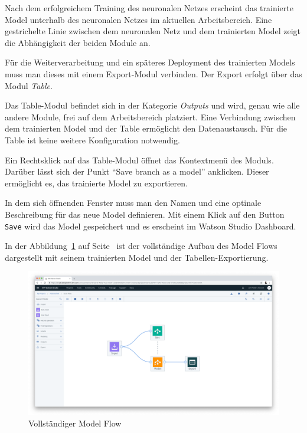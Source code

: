 Nach dem erfolgreichem Training des neuronalen Netzes erscheint das trainierte Model unterhalb des neuronalen Netzes im
aktuellen Arbeitsbereich. Eine gestrichelte Linie zwischen dem neuronalen Netz und dem trainierten Model zeigt die
Abhängigkeit der beiden Module an.

Für die Weiterverarbeitung und ein späteres Deployment des trainierten Models muss man dieses mit einem Export-Modul
verbinden. Der Export erfolgt über das Modul \textit{Table}.

Das Table-Modul befindet sich in der Kategorie \textit{Outputs} und wird, genau wie alle andere Module, frei auf dem
Arbeitsbereich platziert. Eine Verbindung zwischen dem trainierten Model und der Table ermöglicht den Datenaustausch.
Für die Table ist keine weitere Konfiguration notwendig.

Ein Rechtsklick auf das Table-Modul öffnet das Kontextmenü des Moduls. Darüber lässt sich der Punkt
\enquote{Save branch as a model} anklicken. Dieser ermöglicht es, das trainierte Model zu exportieren.

In dem sich öffnenden Fenster muss man den Namen und eine optinale Beschreibung für das neue Model definieren. Mit einem
Klick auf den Button \texttt{Save} wird das Model gespeichert und es erscheint im Watson Studio Dashboard.

In der Abbildung~\ref{fig:umsetzung_model_flow} auf Seite~\pageref{fig:umsetzung_model_flow} ist der vollständige Aufbau
des Model Flows dargestellt mit seinem trainierten Model und der Tabellen-Exportierung.

\begin{figure}[h]
    \centering
    \includegraphics[width=\textwidth]{images/kapitel_3/umsetzung_model_flow.png}
    \caption{Vollständiger Model Flow}
    \label{fig:umsetzung_model_flow}
\end{figure}

